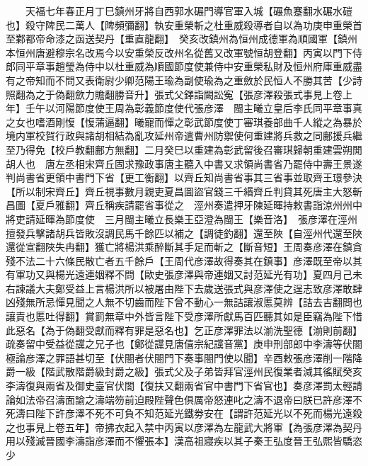 　　天福七年春正月丁巳鎮州牙將自西郭水碾門導官軍入城【碾魚蹇翻水碾水磑也】殺守陴民二萬人【陴頻彌翻】執安重榮斬之杜重威殺導者自以為功庚申重榮首至鄴都帝命漆之函送契丹【重直龍翻】　癸亥改鎮州為恒州成德軍為順國軍【鎮州本恒州唐避穆宗名改焉今以安重榮反改州名從舊又改軍號恒胡登翻】丙寅以門下侍郎同平章事趙瑩為侍中以杜重威為順國節度使兼侍中安重榮私財及恒州府庫重威盡有之帝知而不問又表衛尉少卿范陽王瑜為副使瑜為之重斂於民恒人不勝其苦【少詩照翻為之于偽翻歛力贍翻勝音升】張式父鐸詣闕訟寃【張彦澤殺張式事見上卷上年】壬午以河陽節度使王周為彰義節度使代張彦澤　閩主曦立皇后李氏同平章事真之女也嗜酒剛愎【愎蒲逼翻】曦寵而憚之彰武節度使丁審琪養部曲千人縱之為暴於境内軍校賀行政與諸胡相結為亂攻延州帝遣曹州防禦使何重建將兵救之同鄜援兵繼至乃得免【校戶教翻鄜方無翻】二月癸巳以重建為彰武留後召審琪歸朝重建雲朔閒胡人也　唐左丞相宋齊丘固求豫政事唐主聽入中書又求領尚書省乃罷侍中壽王景遂判尚書省更領中書門下省【更工衡翻】以齊丘知尚書省事其三省事並取齊王璟參決【所以制宋齊丘】齊丘視事數月親吏夏昌圖盜官錢三千緡齊丘判貸其死唐主大怒斬昌圖【夏戶雅翻】齊丘稱疾請罷省事從之　涇州奏遣押牙陳延暉持敕書詣涼州州中將吏請延暉為節度使　三月閩主曦立長樂王亞澄為閩王【樂音洛】　張彦澤在涇州擅發兵擊諸胡兵皆敗沒調民馬千餘匹以補之【調徒釣翻】還至陜【自涇州代還至陜還從宣翻陜失冉翻】獲亡將楊洪乘醉斷其手足而斬之【斷音短】王周奏彦澤在鎮貪殘不法二十六條民散亡者五千餘戶【王周代彦澤故得奏其在鎮事】彦澤既至帝以其有軍功又與楊光遠連姻釋不問【歐史張彦澤與帝連姻又討范延光有功】夏四月己未右諫議大夫鄭受益上言楊洪所以被屠由陛下去歲送張式與彦澤使之逞志致彦澤敢肆凶殘無所忌憚見聞之人無不切齒而陛下曾不動心一無詰讓淑慝莫辨【詰去吉翻問也讓責也慝吐得翻】賞罰無章中外皆言陛下受彦澤所獻馬百匹聽其如是臣竊為陛下惜此惡名【為于偽翻受獻而釋有罪是惡名也】乞正彦澤罪法以湔洗聖德【湔則前翻】疏奏留中受益從讜之兄子也【鄭從讜見唐僖宗紀讜音黨】庚申刑部郎中李濤等伏閤極論彦澤之罪語甚切至【伏閤者伏閤門下奏事閤門使以聞】辛酉敕張彦澤削一階降爵一級【階武散階爵級封爵之級】張式父及子弟皆拜官涇州民復業者減其徭賦癸亥李濤復與兩省及御史臺官伏閤【復扶又翻兩省官中書門下省官也】奏彦澤罰太輕請論如法帝召濤面諭之濤端笏前迫殿陛聲色俱厲帝怒連叱之濤不退帝曰朕已許彦澤不死濤曰陛下許彦澤不死不可負不知范延光鐵劵安在【謂許范延光以不死而楊光遠殺之也事見上卷五年】帝拂衣起入禁中丙寅以彦澤為左龍武大將軍【為張彦澤為契丹用以殘滅晉國李濤詣彦澤而不懼張本】漢高祖寢疾以其子秦王弘度晉王弘熙皆驕恣少

